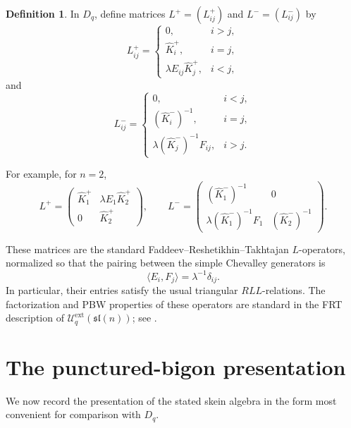 \documentclass[11pt]{amsart}
\numberwithin{equation}{section}
\theoremstyle{definition}
\newtheorem{definition}[equation]{Definition}
\theoremstyle{remark}
\newcommand{\Uc}{\mathcal{U}}
\newcommand{\sln}{\mathfrak{sl}(n)}
\newcommand{\la}{\langle}
\newcommand{\ra}{\rangle}
\begin{document}
\begin{definition}
In \(D_q\), define matrices \(L^+=(L^+_{ij})\) and \(L^-=(L^-_{ij})\) by
\begin{equation}\label{eq:Lplus}
L^+_{ij}=
\begin{cases}
0, & i>j,\\[1mm]
\widehat K_i^{+}, & i=j,\\[1mm]
\lambda E_{ij}\widehat K_j^{+}, & i<j,
\end{cases}
\end{equation}
and
\begin{equation}\label{eq:Lminus}
L^-_{ij}=
\begin{cases}
0, & i<j,\\[1mm]
(\widehat K_i^{-})^{-1}, & i=j,\\[1mm]
\lambda(\widehat K_j^{-})^{-1}F_{ij}, & i>j.
\end{cases}
\end{equation}
\end{definition}

For example, for \(n=2\),
\[
L^+=
\begin{pmatrix}
\widehat K_1^{+} & \lambda E_1\widehat K_2^{+}\\
0 & \widehat K_2^{+}
\end{pmatrix},
\qquad
L^-=
\begin{pmatrix}
(\widehat K_1^{-})^{-1} & 0\\
\lambda(\widehat K_1^{-})^{-1}F_1 & (\widehat K_2^{-})^{-1}
\end{pmatrix}.
\]

These matrices are the standard Faddeev--Reshetikhin--Takhtajan
\(L\)-operators, normalized so that the pairing between the simple Chevalley
generators is
\[
\la E_i,F_j\ra=\lambda^{-1}\delta_{ij}.
\]
In particular, their entries satisfy the usual triangular \(RLL\)-relations.
The factorization and PBW properties of these operators are standard in the
FRT description of \(\Uc_q^{\mathrm{ext}}(\sln)\); see \cite[Chapters~6 and~8]{KS}.

\section{The punctured-bigon presentation}

We now record the presentation of the stated skein algebra in the form most
convenient for comparison with \(D_q\).
\end{document}
